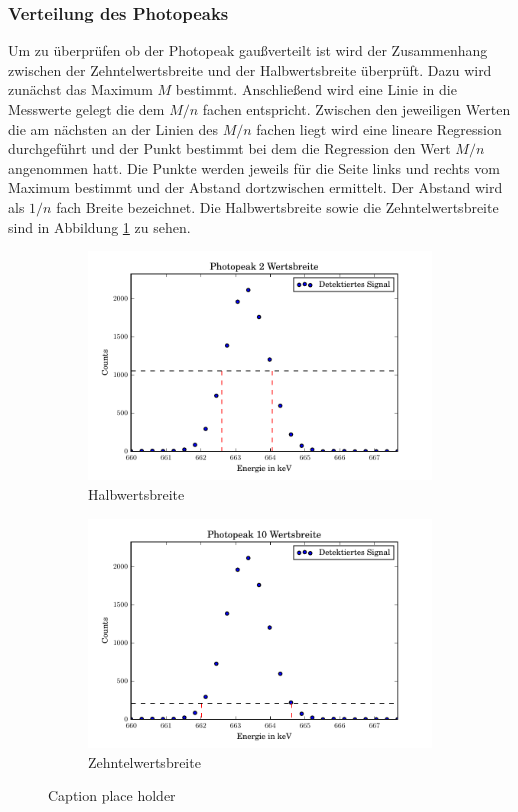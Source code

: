 \subsubsection{Verteilung des Photopeaks}
Um zu überprüfen ob der Photopeak gaußverteilt ist wird der Zusammenhang zwischen der Zehntelwertsbreite und der Halbwertsbreite überprüft. Dazu wird zunächst das Maximum $M$ bestimmt. Anschließend wird eine Linie in die Messwerte gelegt die dem $M/n$ fachen entspricht. Zwischen den jeweiligen Werten die am nächsten an der Linien des $M/n$ fachen liegt wird eine lineare Regression durchgeführt und der Punkt bestimmt bei dem die Regression den Wert $M/n$ angenommen hatt. Die Punkte werden jeweils für die Seite links und rechts vom Maximum bestimmt und der Abstand dortzwischen ermittelt. Der Abstand wird als $1/n$ fach Breite bezeichnet. 
Die Halbwertsbreite sowie die Zehntelwertsbreite sind in Abbildung \ref{fig:Halb} zu sehen.
\begin{figure}[htpb]
	\centering
	\begin{subfigure}[t]{0.5\textwidth}
		\centering
		\includegraphics[width=\textwidth]{./build/2Wertsbreite.pdf}
		\caption{Halbwertsbreite}
	\end{subfigure}%
	\begin{subfigure}[t]{0.5\textwidth}
		\centering
		\includegraphics[width=\textwidth]{./build/10Wertsbreite.pdf}
		\caption{Zehntelwertsbreite}
	\end{subfigure}
	\caption{Caption place holder}
	\label{fig:Halb}
\end{figure}
